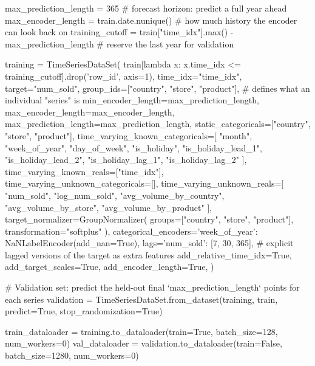 \documentclass[12pt,openany]{book}
\theoremstyle{definition}
\theoremstyle{remark}
\begin{document}
\begin{python}
max_prediction_length = 365          # forecast horizon: predict a full year ahead
max_encoder_length = train.date.nunique()   # how much history the encoder can look back on
training_cutoff = train["time_idx"].max() - max_prediction_length   # reserve the last year for validation

training = TimeSeriesDataSet(
    train[lambda x: x.time_idx <= training_cutoff].drop('row_id', axis=1),
    time_idx="time_idx",
    target="num_sold",
    group_ids=["country", "store", "product"],        # defines what an individual "series" is
    min_encoder_length=max_prediction_length,
    max_encoder_length=max_encoder_length,
    max_prediction_length=max_prediction_length,
    static_categoricals=["country", "store", "product"],
    time_varying_known_categoricals=[
        "month", "week_of_year", "day_of_week", "is_holiday",
        "is_holiday_lead_1", "is_holiday_lead_2",
        "is_holiday_lag_1", "is_holiday_lag_2"
    ],
    time_varying_known_reals=["time_idx"],
    time_varying_unknown_categoricals=[],
    time_varying_unknown_reals=[
        "num_sold", "log_num_sold", "avg_volume_by_country",
        "avg_volume_by_store", "avg_volume_by_product"
    ],
    target_normalizer=GroupNormalizer(
        groups=["country", "store", "product"], transformation="softplus"
    ),
    categorical_encoders={'week_of_year': NaNLabelEncoder(add_nan=True)},
    lags={'num_sold': [7, 30, 365]},     # explicit lagged versions of the target as extra features
    add_relative_time_idx=True,
    add_target_scales=True,
    add_encoder_length=True,
)

# Validation set: predict the held-out final `max_prediction_length` points for each series
validation = TimeSeriesDataSet.from_dataset(training, train, predict=True, stop_randomization=True)

train_dataloader = training.to_dataloader(train=True, batch_size=128, num_workers=0)
val_dataloader = validation.to_dataloader(train=False, batch_size=1280, num_workers=0)
\end{python}
\end{document}
